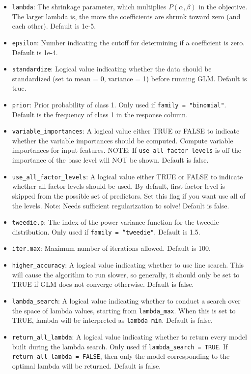 \documentclass[11pt]{article}
\begin{document}
\begin{itemize}
\item \texttt{lambda}: The shrinkage parameter, which multiplies $P(\alpha,\beta)$ in the objective. The larger lambda is, the more the coefficients are shrunk toward zero (and each other). Default is 1e-5.
\item \texttt{epsilon}: Number indicating the cutoff for determining if a coefficient is zero. Default is 1e-4.
\item \texttt{standardize}: Logical value indicating whether the data should be standardized (set to mean = 0, variance = 1) before running GLM. Default is true.
\item \texttt{prior}: Prior probability of class 1. Only used if \texttt{family = "binomial"}. Default is the frequency of class 1 in the response column. 
\item \texttt{variable\_importances}: A logical value either TRUE or FALSE to indicate whether the variable importances should be computed.  Compute variable importances for input features. NOTE: If \texttt{use\_all\_factor\_levels} is off the importance of the base level will NOT be shown. Default is false.
\item \texttt{use\_all\_factor\_levels}: A logical value either TRUE or FALSE to indicate whether all factor levels should be used. By default, first factor level is skipped from the possible set of predictors. Set this flag if you want use all of the levels. Note: Needs sufficient regularization to solve! Default is false.
\item \texttt{tweedie.p}: The index of the power variance function for the tweedie distribution. Only used if \texttt{family = “tweedie"}. Default is 1.5.
\item \texttt{iter.max}: Maximum number of iterations allowed. Default is 100.
\item \texttt{higher\_accuracy}: A logical value indicating whether to use line search. This will cause the algorithm to run slower, so generally, it should only be set to TRUE if GLM does not converge otherwise. Default is false.
\item \texttt{lambda\_search}: A logical value indicating whether to conduct a search over the space of lambda values, starting from \texttt{lambda\_max}. When this is set to TRUE, lambda will be interpreted as \texttt{lambda\_min}. Default is false.
\item \texttt{return\_all\_lambda}: A logical value indicating whether to return every model built during the lambda search. Only used if \texttt{lambda\_search = TRUE}. If \texttt{return\_all\_lambda = FALSE}, then only the model corresponding to the optimal lambda will be returned. Default is false.

\end{itemize}
\end{document}
